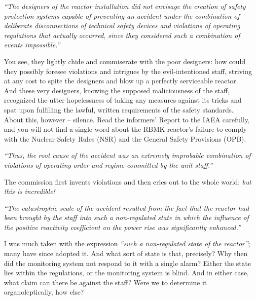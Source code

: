 \documentclass[openright]{bookest}
\begin{document}
\begin{personal}
\textit{``The designers of the reactor installation did not envisage the creation of safety protection systems capable of preventing an accident under the combination of deliberate disconnections of technical safety devices and violations of operating regulations that actually occurred, since they considered such a combination of events impossible.''}
\end{personal}

You see, they lightly chide and commiserate with the poor designers: how could they possibly foresee violations and intrigues by the evil-intentioned staff, striving at any cost to spite the designers and blow up a perfectly serviceable reactor. And these very designers, knowing the supposed maliciousness of the staff, recognized the utter hopelessness of taking any measures against its tricks and spat upon fulfilling the lawful, written requirements of the safety standards. About this, however -- silence. Read the informers' Report to the IAEA carefully, and you will not find a single word about the RBMK reactor's failure to comply with the Nuclear Safety Rules (NSR) and the General Safety Provisions (OPB).

\begin{personal}
\textit{``Thus, the root cause of the accident was an extremely improbable combination of violations of operating order and regime committed by the unit staff.''}
\end{personal}

The commission first invents violations and then cries out to the whole world: \textit{but this is incredible!}

\begin{personal}
\textit{``The catastrophic scale of the accident resulted from the fact that the reactor had been brought by the staff into such a non-regulated state in which the influence of the positive reactivity coefficient on the power rise was significantly enhanced.''}
\end{personal}

I was much taken with the expression \textit{``such a non-regulated state of the reactor''}; many have since adopted it. And what sort of state is that, precisely? Why then did the monitoring system not respond to it with a single alarm? Either the state lies within the regulations, or the monitoring system is blind. And in either case, what claim can there be against the staff? Were we to determine it organoleptically, how else?
\end{document}
